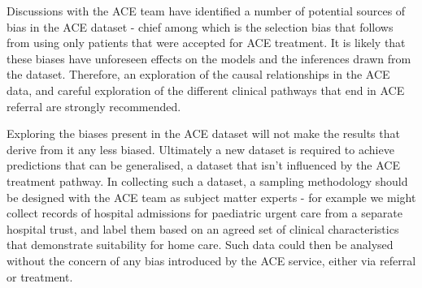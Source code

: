 Discussions with the ACE team have identified a number of potential sources of bias in the ACE dataset - chief among which is the selection bias that follows from using only patients that were accepted for ACE treatment. It is likely that these biases have unforeseen effects on the models and the inferences drawn from the dataset. Therefore, an exploration of the causal relationships in the ACE data, and careful exploration of the different clinical pathways that end in ACE referral are strongly recommended.

Exploring the biases present in the ACE dataset will not make the results that derive from it any less biased. Ultimately a new dataset is required to achieve predictions that can be generalised, a dataset that isn't influenced by the ACE treatment pathway. In collecting such a dataset, a sampling methodology should be designed with the ACE team as subject matter experts - for example we might collect records of hospital admissions for paediatric urgent care from a separate hospital trust, and label them based on an agreed set of clinical characteristics that demonstrate suitability for home care. Such data could then be analysed without the concern of any bias introduced by the ACE service, either via referral or treatment.